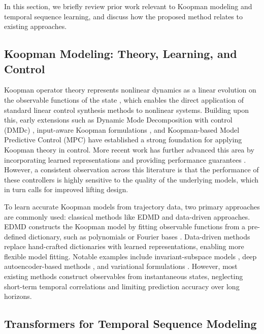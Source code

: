 \documentclass[journal]{IEEEtran}
\begin{document}
In this section, we briefly review prior work relevant to Koopman modeling and temporal sequence learning, and  discuss how the proposed method relates to existing approaches.

\subsection{Koopman Modeling: Theory, Learning, and Control}

Koopman operator theory represents nonlinear dynamics as a linear evolution on the observable functions of the state \cite{koopman1931hamiltonian, koopman1932spectra, mezic2005spectral}, which enables the direct application of standard linear control synthesis methods to nonlinear systems. Building upon this, early extensions such as Dynamic Mode Decomposition with control (DMDc) \cite{proctor2016dmdc}, input-aware Koopman formulations \cite{proctor2018generalizing, brunton2016invariant}, and Koopman-based Model Predictive Control (MPC) \cite{korda2018linear} have established a strong foundation for applying Koopman theory in control. More recent work has further advanced this area by incorporating learned representations and providing performance guarantees \cite{han2020deep, shi2022deep, strasser2026overview, duran2025control}. However, a consistent observation across this literature is that the performance of these controllers is highly sensitive to the quality of the underlying models, which in turn calls for improved lifting design. 

To learn accurate Koopman models from trajectory data, two primary approaches are commonly used: classical methods like EDMD and data-driven approaches. EDMD constructs the Koopman model by fitting observable functions from a pre-defined dictionary, such as polynomials or Fourier bases \cite{williams2015data, williams2015kernel, klus2018data}. Data-driven methods replace hand-crafted dictionaries with learned representations, enabling more flexible model fitting. Notable examples include invariant-subspace models \cite{takeishi2017koopman}, deep autoencoder-based methods \cite{lusch2018deep, yeung2019learning}, and variational formulations \cite{morton2019deep, yuan2022variational}. However, most existing methods construct observables from instantaneous states, neglecting short-term temporal correlations and limiting prediction accuracy over long horizons.


\subsection{Transformers for Temporal Sequence Modeling}
\end{document}
